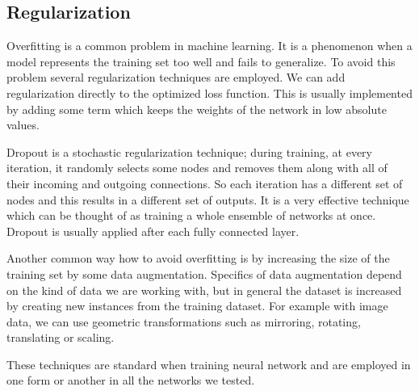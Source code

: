 \subsection{Regularization}
\label{sec:regularization}
Overfitting is a common problem in machine learning. It is a phenomenon when a model represents the training set too well and fails to generalize. To avoid this problem several regularization techniques are employed. We can add regularization directly to the optimized loss function. This is usually implemented by adding some term which keeps the weights of the network in low absolute values. \par
Dropout \cite{srivastava_dropout:_2014} is a stochastic regularization technique; during training, at every iteration, it randomly selects some nodes and removes them along with all of their incoming and outgoing connections. So each iteration has a different set of nodes and this results in a different set of outputs. It is a very effective technique which can be thought of as training a whole ensemble of networks at once. Dropout is usually applied after each fully connected layer. \par
Another common way how to avoid overfitting is by increasing the size of the training set by some data augmentation. Specifics of data augmentation depend on the kind of data we are working with, but in general the dataset is increased by creating new instances from the training dataset. For example with image data, we can use geometric transformations such as mirroring, rotating, translating or scaling. \par
These techniques are standard when training neural network and are employed in one form or another in all the networks we tested.

